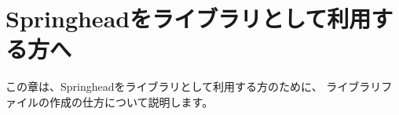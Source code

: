 \newpage
\section{Springheadをライブラリとして利用する方へ}
\label{sec:ForNonDevelopper}

\noindent
この章は、Springheadをライブラリとして利用する方のために、
ライブラリファイルの作成の仕方について説明します。

